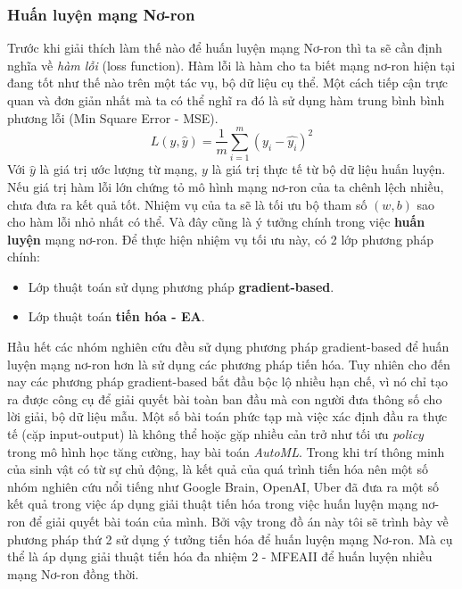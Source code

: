     \subsubsection{Huấn luyện mạng Nơ-ron}
    Trước khi giải thích làm thế nào để huấn luyện mạng Nơ-ron thì ta sẽ cần định nghĩa về \emph{hàm lỗi} (loss function). Hàm lỗi là hàm cho ta biết mạng nơ-ron hiện tại đang tốt như thế nào trên một tác vụ, bộ dữ liệu cụ thể. Một cách tiếp cận trực quan và đơn giản nhất mà ta có thể nghĩ ra đó là sử dụng hàm trung bình bình phương lỗi (Min Square Error - MSE).
    \begin{equation}
      L(y, \widehat{y}) = \frac{1}{m}\sum_{i=1}^m(y_i - \widehat{y_i})^2
    \end{equation}
    Với $\widehat{y}$ là giá trị ước lượng từ mạng, $y$ là giá trị thực tế từ bộ dữ liệu huấn luyện. Nếu giá trị hàm lỗi lớn chứng tỏ mô hình mạng nơ-ron của ta chênh lệch nhiều, chưa đưa ra kết quả tốt. Nhiệm vụ của ta sẽ là tối ưu bộ tham số $(w,b)$ sao cho hàm lỗi nhỏ nhất có thể. Và đây cũng là ý tưởng chính trong việc \textbf{huấn luyện} mạng nơ-ron. Để thực hiện nhiệm vụ tối ưu này, có 2 lớp phương pháp chính:
    \begin{itemize}
        \item Lớp thuật toán sử dụng phương pháp \textbf{gradient-based}.
        \item Lớp thuật toán \textbf{tiến hóa - EA}.
    \end{itemize}
    Hầu hết các nhóm nghiên cứu đều sử dụng phương pháp gradient-based để huấn luyện mạng nơ-ron hơn là sử dụng các phương pháp tiến hóa. Tuy nhiên cho đến nay các phương pháp gradient-based bắt đầu bộc lộ nhiều hạn chế, vì nó chỉ tạo ra được công cụ để giải quyết bài toàn ban đầu mà con người đưa thông số cho lời giải, bộ dữ liệu mẫu. Một số bài toán phức tạp mà việc xác định đầu ra thực tế (cặp input-output) là không thể hoặc gặp nhiều cản trở như tối ưu \emph{policy} trong mô hình học tăng cường, hay bài toán \emph{AutoML}. Trong khi trí thông minh của sinh vật có từ sự chủ động, là kết quả của quá trình tiến hóa nên một số nhóm nghiên cứu nổi tiếng như Google Brain, OpenAI, Uber đã đưa ra một số kết quả trong việc áp dụng giải thuật tiến hóa trong việc huấn luyện mạng nơ-ron để giải quyết bài toán của mình.
    Bởi vậy trong đồ án này tôi sẽ trình bày về phương pháp thứ 2 sử dụng ý tưởng tiến hóa để huấn luyện mạng Nơ-ron. Mà cụ thể là áp dụng giải thuật tiến hóa đa nhiệm 2 - MFEAII để huấn luyện nhiều mạng Nơ-ron đồng thời.

